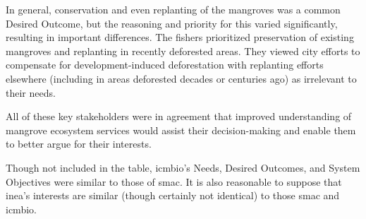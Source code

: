 In general, conservation and even replanting of the mangroves was a common Desired Outcome, but the reasoning and priority for this varied significantly, resulting in important differences. The fishers prioritized preservation of existing mangroves and replanting in recently deforested areas. They viewed city efforts to compensate for development-induced deforestation with replanting efforts elsewhere (including in areas deforested decades or centuries ago) as irrelevant to their needs. 

All of these key stakeholders were in agreement that improved understanding of mangrove ecosystem services would assist their decision-making and enable them to better argue for their interests.  

Though not included in the table, \ac{icmbio}'s Needs, Desired Outcomes, and System Objectives were similar to those of \ac{smac}. It is also reasonable to suppose that \ac{inea}'s interests are similar (though certainly not identical) to those \ac{smac} and \ac{icmbio}.

